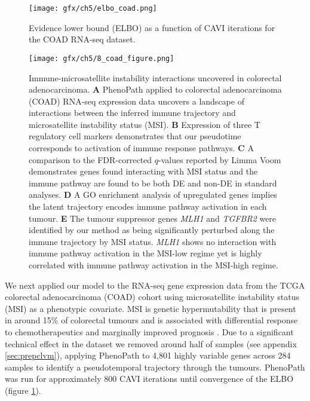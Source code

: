 \begin{figure}
\centering
\texttt{[image: gfx/ch5/elbo\_coad.png]}
\caption{Evidence lower bound (ELBO) as a function of CAVI iterations for the COAD RNA-seq dataset.}\label{fig:elbo_coad}
\end{figure}

\begin{figure}
\texttt{[image: gfx/ch5/8\_coad\_figure.png]}
\caption{Immune-microsatellite instability interactions uncovered in colorectal adenocarcinoma.
\textbf{A} PhenoPath applied to colorectal adenocarcinoma (COAD) RNA-seq expression data uncovers a landscape of interactions between the inferred immune trajectory and microsatellite instability status (MSI).
\textbf{B} Expression of three T regulatory cell markers demonstrates that our pseudotime corresponds to activation of immune response pathways.
\textbf{C} A comparison to the FDR-corrected $q$-values reported by Limma Voom demonstrates genes found interacting with MSI status and the immune pathway are found to be both DE and non-DE in standard analyses.
\textbf{D} A GO enrichment analysis of upregulated genes implies the latent trajectory encodes immune pathway activation in each tumour.
\textbf{E} The tumour suppressor genes \emph{MLH1} and \emph{TGFBR2} were identified by our method as being significantly perturbed along the immune trajectory by MSI status. \emph{MLH1} shows no interaction with immune pathway activation in the MSI-low regime yet is highly correlated with immune pathway activation in the MSI-high regime.}
\label{fig:coad}
\end{figure}



We next applied our model to the RNA-seq gene expression data from the TCGA colorectal adenocarcinoma (COAD) cohort \cite{cancer2012comprehensive} using microsatellite instability status (MSI) as a phenotypic covariate. MSI is genetic hypermutability that is present in around 15\% of colorectal tumours and is associated with differential response to chemotherapeutics and marginally improved prognosis \cite{Boland2010-mz}. Due to a significant technical effect in the dataset we removed around half of samples (see appendix \ref{sec:prepclvm}), applying PhenoPath to 4,801 highly variable genes across 284 samples to identify a pseudotemporal trajectory through the tumours. PhenoPath was run for approximately 800 CAVI iterations until convergence of the ELBO (figure \ref{fig:elbo_coad}).

